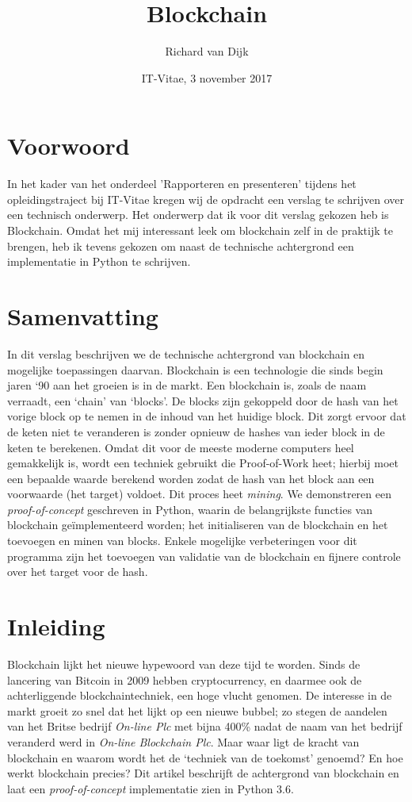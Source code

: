 \documentclass{article}
\title{Blockchain}
\date{IT-Vitae, 3 november 2017}
\author{Richard van Dijk}
\begin{document}
\maketitle
\newpage

\newpage
\tableofcontents
\newpage
{}
\setcounter{page}{1}

\section{Voorwoord}
In het kader van het onderdeel 'Rapporteren en presenteren' tijdens het opleidingstraject bij IT-Vitae kregen wij de opdracht een verslag te schrijven over een technisch onderwerp. Het onderwerp dat ik voor dit verslag gekozen heb is Blockchain. Omdat het mij interessant leek om blockchain zelf in de praktijk te brengen, heb ik tevens gekozen om naast de technische achtergrond een implementatie in Python te schrijven.
\newpage
\section{Samenvatting}
In dit verslag beschrijven we de technische achtergrond van blockchain en mogelijke toepassingen daarvan. Blockchain is een technologie die sinds begin jaren `90 aan het groeien is in de markt. Een blockchain is, zoals de naam verraadt, een `chain' van `blocks'. De blocks zijn gekoppeld door de hash van het vorige block op te nemen in de inhoud van het huidige block. Dit zorgt ervoor dat de keten niet te veranderen is zonder opnieuw de hashes van ieder block in de keten te berekenen. Omdat dit voor de meeste moderne computers heel gemakkelijk is, wordt een techniek gebruikt die Proof-of-Work heet; hierbij moet een bepaalde waarde berekend worden zodat de hash van het block aan een voorwaarde (het target) voldoet. Dit proces heet \textit{mining}. We demonstreren een \textit{proof-of-concept} geschreven in Python, waarin de belangrijkste functies van blockchain geïmplementeerd worden; het initialiseren van de blockchain en het toevoegen en minen van blocks. Enkele mogelijke verbeteringen voor dit programma zijn het toevoegen van validatie van de blockchain en fijnere controle over het target voor de hash.
\newpage
\section{Inleiding}
Blockchain lijkt het nieuwe hypewoord van deze tijd te worden. Sinds de lancering van Bitcoin in 2009 hebben cryptocurrency, en daarmee ook de achterliggende blockchaintechniek, een hoge vlucht genomen. De interesse in de markt groeit zo snel dat het lijkt op een nieuwe bubbel; zo stegen de aandelen van het Britse bedrijf \textit{On-line Plc} met bijna 400\% nadat de naam van het bedrijf veranderd werd in \textit{On-line Blockchain Plc}. Maar waar ligt de kracht van blockchain en waarom wordt het de `techniek van de toekomst' genoemd? En hoe werkt blockchain precies? Dit artikel beschrijft de achtergrond van blockchain en laat een \textit{proof-of-concept} implementatie zien in Python 3.6.
\end{document}

